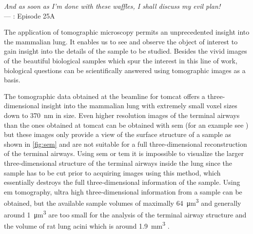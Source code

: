 \acresetall
{}\label{ch:discussion}
\begin{flushright}{\slshape And as soon as I'm done with these waffles, I shall discuss my evil plan!} \\ \medskip
	---  \citep{Zim}: Episode 25A
\end{flushright}
\vspace{6cm}

The application of tomographic microscopy permits an un\-prec\-e\-dent\-ed insight into the mammalian lung. It enables us to see and observe the object of interest to gain insight into the details of the sample to be studied. Besides the vivid images of the beautiful biological samples which spur the interest in this line of work, biological questions can be scientifically answered using tomographic images as a basis.

The tomographic data obtained at the beamline for \ac{tomcat} offers a three-dimensional insight into the mammalian lung with extremely small voxel sizes down to \SI{370}{\nano\meter} in size. Even higher resolution images of the terminal airways than the ones obtained at \ac{tomcat} can be obtained with \ac{sem} (for an example see \cite[Figure 12]{Weibel2009}) but these images only provide a view of the surface structure of a sample as shown in \autoref{fig:sem} and are not suitable for a full three-dimensional reconstruction of the terminal airways. Using \ac{sem} or \ac{tem} it is impossible to visualize the larger three-dimensional structure of the terminal airways inside the lung since the sample has to be cut prior to acquiring images using this method, which essentially destroys the full three-dimensional information of the sample. Using \ac{em} tomography, ultra high three-dimensional information from a sample can be obtained, but the available sample volumes of maximally \SI{64}{\micro\meter\cubed} \cite{Martone2002} and generally around \SI{1}{\micro\meter\cubed} \cite{Lucic2005} are too small for the analysis of the terminal airway structure and the volume of rat lung acini which is around \SI{1.9}{\milli\meter\cubed} \cite{Rodriguez1987}.

